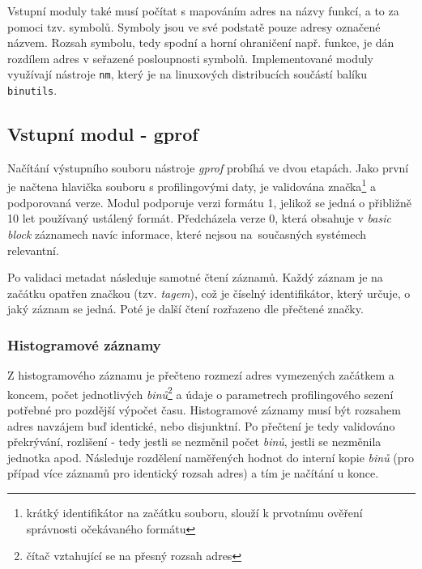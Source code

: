 \documentclass[czech,BP]{thesiskiv}
\begin{document}
Vstupní moduly také musí počítat s mapováním adres na názvy funkcí, a to za pomoci tzv. symbolů. Symboly jsou ve své podstatě pouze adresy označené názvem. Rozsah symbolu, tedy spodní a horní ohraničení např. funkce, je dán rozdílem adres v seřazené posloupnosti symbolů. Implementované moduly využívají nástroje \texttt{nm}, který je na linuxových distribucích součástí balíku \texttt{binutils}.

\subsection{Vstupní modul - gprof}

Načítání výstupního souboru nástroje \emph{gprof} probíhá ve dvou etapách. Jako první je načtena hlavička souboru s profilingovými daty, je validována  značka\footnote{krátký identifikátor na začátku souboru, slouží k prvotnímu ověření správnosti očekávaného formátu} a podporovaná verze. Modul podporuje verzi formátu 1, jelikož se jedná o přibližně 10 let používaný ustálený formát. Předcházela verze 0, která obsahuje v \emph{basic block} záznamech navíc informace, které nejsou na~současných systémech relevantní.

Po validaci metadat následuje samotné čtení záznamů. Každý záznam je na začátku opatřen značkou (tzv. \emph{tagem}), což je číselný identifikátor, který určuje, o jaký záznam se jedná. Poté je další čtení rozřazeno dle přečtené značky.

\subsubsection*{Histogramové záznamy}

Z histogramového záznamu je přečteno rozmezí adres vymezených začátkem a koncem, počet jednotlivých \emph{binů}\footnote{čítač vztahující se na přesný rozsah adres} a údaje o parametrech profilingového sezení potřebné pro pozdější výpočet času. Histogramové záznamy musí být rozsahem adres navzájem buď identické, nebo disjunktní. Po přečtení je tedy validováno překrývání, rozlišení - tedy jestli se nezměnil počet \emph{binů}, jestli se nezměnila jednotka apod. Následuje rozdělení naměřených hodnot do interní kopie \emph{binů} (pro případ více záznamů pro identický rozsah adres) a tím je načítání u konce.
\end{document}
